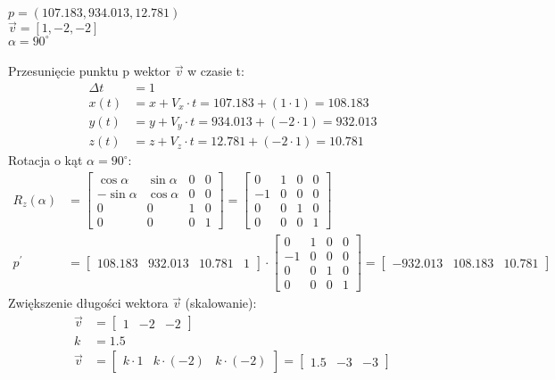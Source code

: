 \documentclass[a4paper]{article}
\begin{document}
\noindent$p = (107.183, 934.013, 12.781)$\\
$\vec{v}=[1, -2, -2]$	\\
$\alpha=90^{\circ}$		\\ \\
Przesunięcie punktu p wektor $\vec{v}$ w czasie t:
\begin{align*}
\Delta t &= 1\\
x(t) &= x + V_x\cdot t = 107.183 + (1\cdot 1) = 108.183\\
y(t) &= y + V_y\cdot t = 934.013 + (-2 \cdot 1) = 932.013\\
z(t) &= z + V_z\cdot t = 12.781 + (-2 \cdot 1) = 10.781
\end{align*}
Rotacja o kąt $\alpha= 90^{\circ}$:
\begin{align*}
R_z(\alpha) &= 
\left[
\begin{matrix}
\cos\alpha & \sin\alpha & 0 & 0\\
-\sin\alpha & \cos\alpha & 0 & 0\\
0 & 0 & 1 & 0\\
0 & 0 & 0 & 1
\end{matrix}
\right] 
=
\left[
\begin{matrix}
0 & 1 & 0 & 0\\
-1 & 0 & 0 & 0\\
0 & 0 & 1 & 0\\
0 & 0 & 0 & 1
\end{matrix}
\right] 
\\
p^{\prime} &= \left[\begin{matrix}
 108.183 & 932.013 & 10.781 & 1
\end{matrix}\right] \cdot
\left[
\begin{matrix}
0 & 1 & 0 & 0\\
-1 & 0 & 0 & 0\\
0 & 0 & 1 & 0\\
0 & 0 & 0 & 1
\end{matrix}
\right] = 
\left[\begin{matrix}
 -932.013 & 108.183 & 10.781
\end{matrix}\right]
\end{align*}
Zwiększenie długości wektora $\vec{v}$ (skalowanie):
\begin{align*}
\vec{v} &= \left[\begin{matrix}
 1 & -2 & -2
\end{matrix}\right] \\
k &= 1.5 \\
\vec{v} &= \left[\begin{matrix}
 k\cdot1 & k\cdot(-2) & k\cdot (-2)
\end{matrix}\right]
=
\left[\begin{matrix}
1.5 & -3 & -3
\end{matrix}\right]\\
\end{align*}
\end{document}
